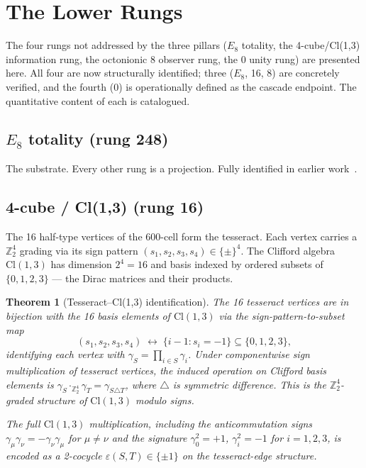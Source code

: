 \documentclass[12pt]{article}
\newtheorem{theorem}{Theorem}
\begin{document}
\section{The Lower Rungs}\label{sec:lower-rungs}

The four rungs not addressed by the three pillars ($E_8$ totality, the 4-cube/Cl(1,3) information rung, the octonionic 8 observer rung, the 0 unity rung) are presented here. All four are now structurally identified; three ($E_8$, 16, 8) are concretely verified, and the fourth (0) is operationally defined as the cascade endpoint. The quantitative content of each is catalogued.

\subsection{$E_8$ totality (rung 248)}

The substrate. Every other rung is a projection. Fully identified in earlier work~\citep{SmartXXII}.

\subsection{4-cube / Cl(1,3) (rung 16)}\label{sec:lower:info}

The 16 half-type vertices of the 600-cell form the tesseract. Each vertex carries a $\mathbb{Z}_2^4$ grading via its sign pattern $(s_1, s_2, s_3, s_4) \in \{\pm\}^4$. The Clifford algebra $\mathrm{Cl}(1,3)$ has dimension $2^4 = 16$ and basis indexed by ordered subsets of $\{0,1,2,3\}$ --- the Dirac matrices and their products.

\begin{theorem}[Tesseract--Cl(1,3) identification]\label{thm:cl13}
The 16 tesseract vertices are in bijection with the 16 basis elements of $\mathrm{Cl}(1,3)$ via the sign-pattern-to-subset map
\[
(s_1, s_2, s_3, s_4) \;\longleftrightarrow\; \{i - 1 : s_i = -1\} \subseteq \{0, 1, 2, 3\},
\]
identifying each vertex with $\gamma_S = \prod_{i \in S} \gamma_i$. Under componentwise sign multiplication of tesseract vertices, the induced operation on Clifford basis elements is $\gamma_S \cdot_{\mathbb{Z}_2^4} \gamma_T = \gamma_{S \triangle T}$, where $\triangle$ is symmetric difference. This is the $\mathbb{Z}_2^4$-graded structure of $\mathrm{Cl}(1,3)$ modulo signs.

The full $\mathrm{Cl}(1,3)$ multiplication, including the anticommutation signs $\gamma_\mu \gamma_\nu = -\gamma_\nu \gamma_\mu$ for $\mu \neq \nu$ and the signature $\gamma_0^2 = +1$, $\gamma_i^2 = -1$ for $i = 1,2,3$, is encoded as a 2-cocycle $\varepsilon(S, T) \in \{\pm 1\}$ on the tesseract-edge structure.
\end{theorem}
\end{document}

